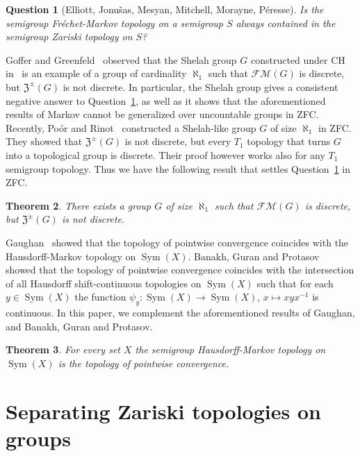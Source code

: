 \documentclass[11pt]{amsart}
\newtheorem{theorem}{Theorem}[section]
\newtheorem{question}[theorem]{Question}
\theoremstyle{definition}
\newcommand{\N}{\mathbb N}
\newcommand{\Sym}{\operatorname{Sym}}
\begin{document}
\begin{question}[Elliott, Jonu\v{s}as, Mesyan, Mitchell, Morayne, P\'{e}resse]\label{q4}
Is the semigroup Fr\'echet-Markov topology on a semigroup $S$ always contained in the semigroup Zariski topology on $S$?
\end{question}

Goffer and Greenfeld~\cite{GG} observed that the Shelah group $G$ constructed under CH in~\cite{Shelah} is an example of a group of cardinality $\aleph_1$ such that $\mathcal{FM}(G)$ is discrete, but $\mathfrak{Z}^{\pm}(G)$ is not discrete. In particular, the Shelah group gives a consistent negative answer to Question~\ref{q4}, as well as it  shows that the aforementioned results of Markov cannot be generalized over uncountable groups in ZFC. Recently, Poór and Rinot~\cite{PR} constructed a Shelah-like group $G$ of size $\aleph_1$ in ZFC. They showed that $\mathfrak{Z}^{\pm}(G)$ is not discrete, but every $T_1$ topology that turns $G$ into a topological group is discrete. Their proof however works also for any $T_1$ semigroup topology. Thus we have the following result that settles Question~\ref{q4} in ZFC. 

\begin{theorem}\label{shelah}
There exists a group $G$ of size $\aleph_1$ such that $\mathcal{FM}(G)$ is discrete, but $\mathfrak{Z}^{\pm}(G)$ is not discrete.    
\end{theorem}


Gaughan~\cite{Gaughan} showed that the topology of pointwise convergence coincides with the Hausdorff-Markov topology on $\Sym(X)$. Banakh, Guran and Protasov~\cite{Banakh} showed that the topology of pointwise convergence coincides with the intersection of all Hausdorff shift-continuous topologies on $\Sym(X)$ such that for each $y\in \Sym(X)$ the function $\psi_y:\Sym(X)\rightarrow \Sym(X)$, $x\mapsto xyx^{-1}$ is continuous. 
In this paper, we complement the aforementioned results of Gaughan, and Banakh, Guran and Protasov.

\begin{theorem}\label{paramin}
For every set $X$ the semigroup Hausdorff-Markov topology on $\Sym(X)$ is the topology of pointwise convergence.   
\end{theorem}


 
\medskip


\section{Separating Zariski topologies on groups}
\end{document}
